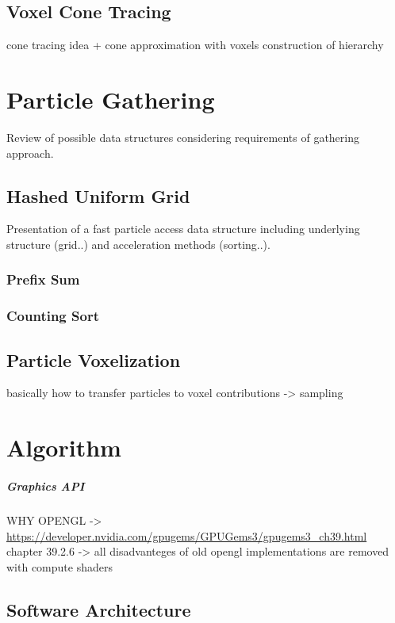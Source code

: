 \documentclass[hyperref,german,diplominf]{cgvpub}
\begin{document}
\section{Voxel Cone Tracing}
cone tracing idea + cone approximation with voxels
construction of hierarchy

\chapter{Particle Gathering}

Review of possible data structures considering requirements of gathering approach.

\section{Hashed Uniform Grid}

Presentation of a fast particle access data structure including underlying structure (grid..) and acceleration methods (sorting..).

\subsection{Prefix Sum}

\subsection{Counting Sort}

\section{Particle Voxelization}

basically how to transfer particles to voxel contributions
-> sampling

\chapter{Algorithm}

\paragraph{Graphics API} WHY OPENGL ->  \url{https://developer.nvidia.com/gpugems/GPUGems3/gpugems3_ch39.html} chapter 39.2.6 -> all disadvanteges of old opengl implementations are removed with compute shaders 

\section{Software Architecture}
\end{document}

